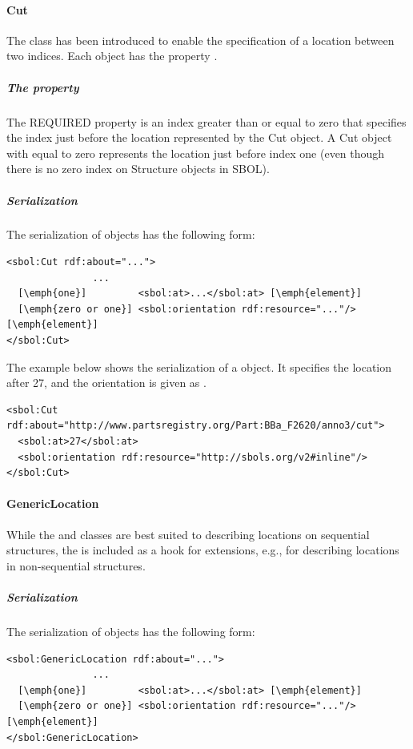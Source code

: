 \paragraph{Cut}
\label{sec:Cut}
The  class has been introduced to enable the specification of a location between two indices. 
Each  object has the property .

\subparagraph{The  property}
\label{sec:at}
The REQUIRED  property is an index greater than or equal to zero that specifies the index just before the location represented by the Cut object. 
A Cut object with  equal to zero represents the location just before index one (even though there is no zero index on Structure objects in SBOL). 

\subparagraph{Serialization}

The serialization of  objects has the following form:
\begin{lstlisting}
<sbol:Cut rdf:about="...">
               ...   
  [\emph{one}]         <sbol:at>...</sbol:at> [\emph{element}] 
  [\emph{zero or one}] <sbol:orientation rdf:resource="..."/> [\emph{element}] 
</sbol:Cut>
\end{lstlisting}

The example below shows the serialization of a  object. It specifies the location after 27, and the orientation is given as .
\begin{lstlisting}
<sbol:Cut rdf:about="http://www.partsregistry.org/Part:BBa_F2620/anno3/cut">
  <sbol:at>27</sbol:at>
  <sbol:orientation rdf:resource="http://sbols.org/v2#inline"/>
</sbol:Cut>
\end{lstlisting}


\paragraph{GenericLocation}
\label{sec:GenericLocation}

While the  and  classes are best suited to
describing locations on sequential structures, the
 is included as a hook for extensions, e.g., for
describing locations in non-sequential structures.


\subparagraph{Serialization}

The serialization of  objects has the following form:
\begin{lstlisting}
<sbol:GenericLocation rdf:about="...">
               ...   
  [\emph{one}]         <sbol:at>...</sbol:at> [\emph{element}] 
  [\emph{zero or one}] <sbol:orientation rdf:resource="..."/> [\emph{element}] 
</sbol:GenericLocation>
\end{lstlisting}

